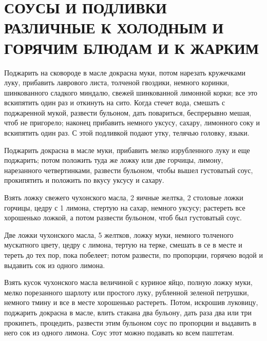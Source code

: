 \section{СОУСЫ И ПОДЛИВКИ РАЗЛИЧНЫЕ К ХОЛОДНЫМ И ГОРЯЧИМ БЛЮДАМ И К ЖАРКИМ} %


Поджарить на сковороде в масле докрасна муки, потом нарезать кружечками луку, прибавить лаврового листа, толченой гвоздики, немного коринки, шинкованного сладкого миндалю, свежей шинкованной лимонной корки; все это вскипятить один раз и откинуть на сито. Когда стечет вода, смешать с поджаренной мукой, развести бульоном, дать повариться, беспрерывно мешая, чтоб не пригорело; наконец прибавить немного уксусу, сахару, лимонного соку и вскипятить один раз. С этой подливкой подают утку, телячью головку, языки. 


Поджарить докрасна в масле муки, прибавить мелко изрубленного луку и еще поджарить; потом положить туда же ложку или две горчицы, лимону, нарезанного четвертинками, развести бульоном, чтобы вышел густоватый соус, прокипятить и положить по вкусу уксусу и сахару. 


Взять ложку свежего чухонского масла, 2 яичные желтка, 2 столовые ложки горчицы, цедру с 1 лимона, стертую на сахар, немного уксусу; растереть все хорошенько ложкой, а потом развести бульоном, чтоб был густоватый соус. 


Две ложки чухонского масла, 5 желтков, ложку муки, немного толченого мускатного цвету, цедру с лимона, тертую на терке, смешать в се в месте и тереть до тех пор, пока побелеет; потом развести, по пропорции, горячею водой и выдавить сок из одного лимона. 


Взять кусок чухонского масла величиной с куриное яйцо, полную ложку муки, мелко порезанного шарлоту или простого луку, рубленной зеленой петрушки, немного тмину и все в месте хорошенько растереть. Потом, искрошив луковицу, поджарить докрасна в масле, влить стакана два бульону, дать раза два или три прокипеть, процедить, развести этим бульоном соус по пропорции и выдавить в него сок из одного лимона. Соус этот можно подавать ко всем паштетам. 

